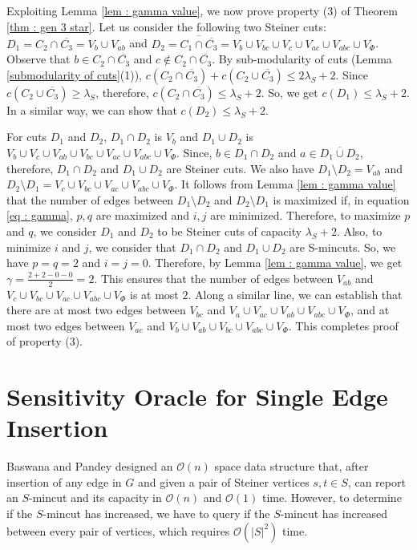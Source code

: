 \documentclass[letterpaper,11pt]{article}
\begin{document}
Exploiting Lemma \ref{lem : gamma value}, we now prove property (3) of Theorem \ref{thm : gen 3 star}. Let us consider the following two Steiner cuts: $D_1=C_2\cap \overline{C_3}=V_b\cup V_{ab}$ and $D_2=\overline{C_1\cap \overline{C_3}}=V_b\cup V_{bc} \cup V_{c}\cup V_{ac}\cup V_{abc} \cup V_{\Phi}$. Observe that $b\in C_2\cap \overline{C_3}$ and $c\notin C_2\cap \overline{C_3}$. By sub-modularity of cuts (Lemma \ref{submodularity of cuts}(1)), $c(C_2\cap \overline{C_3})+c(C_2\cup \overline{C_3})\le 2\lambda_S+2$. Since $c(C_2\cup \overline{C_3})\ge \lambda_S$, therefore, $c(C_2\cap \overline{C_3})\le \lambda_S+2$. So, we get $c(D_1)\le \lambda_S+2$. In a similar way, we can show that $c(D_2)\le \lambda_S+2$. 

For cuts $D_1$ and $D_2$, $D_1\cap D_2$ is $V_b$ and $D_1\cup D_2$ is $V_b \cup V_c \cup V_{ab} \cup V_{bc} \cup V_{ac}\cup V_{abc} \cup V_{\Phi}$. Since, $b\in D_1\cap D_2$ and $a\in \overline{D_1\cup D_2}$, therefore, $D_1\cap D_2$ and $D_1\cup D_2$ are Steiner cuts. We also have $D_1\setminus D_2=V_{ab}$ and $D_2\setminus D_1=V_c\cup V_{bc}\cup V_{ac}\cup V_{abc} \cup V_{\Phi}$. It follows from Lemma \ref{lem : gamma value} that the number of edges between $D_1\setminus D_2$ and $D_2\setminus D_1$ is maximized if, in equation \ref{eq : gamma}, $p,q$ are maximized and $i,j$ are minimized. Therefore, to maximize $p$ and $q$, we consider $D_1$ and $D_2$ to be Steiner cuts of capacity $\lambda_S+2$. Also, to minimize $i$ and $j$, we consider that $D_1\cap D_2$ and $D_1\cup D_2$ are S-mincuts. So, we have $p=q=2$ and $i=j=0$. Therefore, by Lemma \ref{lem : gamma value}, we get $\gamma= \frac{2+2-0-0}{2}=2$. This ensures that the number of edges between $V_{ab}$ and $V_c\cup V_{bc}\cup V_{ac}\cup V_{abc} \cup V_{\Phi}$ is at most $2$. Along a similar line, we can establish that there are at most two edges between $V_{bc}$ and $V_a\cup V_{ac}\cup V_{ab}\cup V_{abc} \cup V_{\Phi}$, and at most two edges between $V_{ac}$ and $V_b\cup V_{ab}\cup V_{bc}\cup V_{abc} \cup V_{\Phi}$. This completes proof of property (3). 

\section{Sensitivity Oracle for Single Edge Insertion} \label{app : single edge insertion}
 Baswana and Pandey \cite{DBLP:conf/soda/BaswanaP22} designed an ${\mathcal O}(n)$ space data structure that, after insertion of any edge in $G$ and given a pair of Steiner vertices $s,t\in S$, can report an $S$-mincut and its capacity in ${\mathcal O}(n)$ and ${\mathcal O}(1)$ time. However, to determine if the $S$-mincut has increased, we have to query if the $S$-mincut has increased between every pair of vertices, which requires ${\mathcal O}(|S|^2)$ time.
\end{document}
